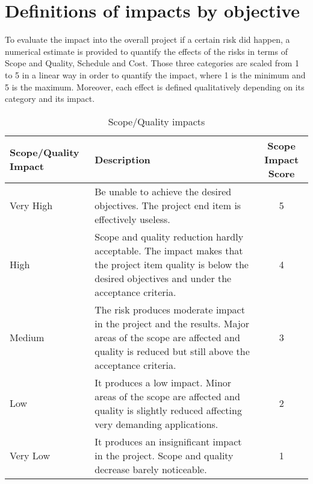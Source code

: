 \section{Definitions of impacts by objective}
\label{3.2}
To evaluate the impact into the overall project if a certain risk did happen, a numerical estimate is provided to quantify the effects of the risks in terms of Scope and Quality, Schedule and Cost. Those three categories are scaled from 1 to 5 in a linear way in order to quantify the impact, where 1 is the minimum and 5 is the maximum. Moreover, each effect is defined qualitatively depending on its category and its impact. 

\begin{table}[H]
	\centering
	\begin{tabular}{l >{\raggedright\arraybackslash}p{6.3cm} c}
		
		\toprule[2pt]
		
		\textbf{Scope/Quality Impact} &  \textbf{Description}  & \textbf{Scope Impact Score}\\
		
		\midrule [1.5pt]
		
		Very High & Be unable to achieve the desired objectives. The project end item is effectively useless. & 5\vspace{0.2cm} \\
		
		\midrule
		
		High & Scope and quality reduction hardly acceptable. The impact makes that the project item quality is below the desired objectives and under the acceptance criteria. & 4\vspace{0.2cm} \\
		
		\midrule
		
		Medium & The risk produces moderate impact in the project and the results. Major areas of the scope are affected and quality is reduced but still above the acceptance criteria. & 3\vspace{0.2cm} \\
	
		\midrule
	
		Low & It produces a low impact. Minor areas of the scope are affected and quality is slightly reduced affecting very demanding applications. & 2\vspace{0.2cm} \\
	
		\midrule
	
		Very Low & It produces an insignificant impact in the project. Scope and quality decrease barely noticeable. & 1\vspace{0.2cm} \\
			
		\bottomrule[2pt]
		
	\end{tabular}
	\caption{Scope/Quality impacts}
\end{table}
	
